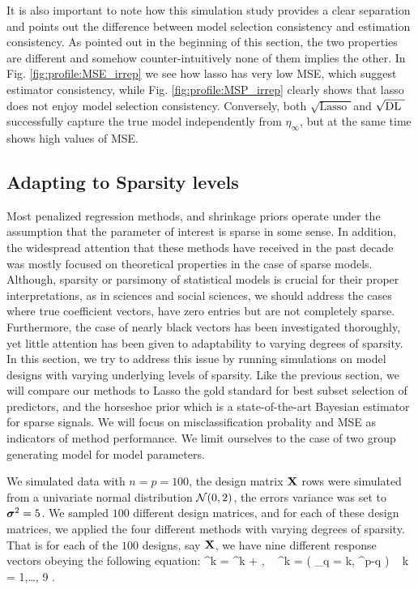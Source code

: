 \documentclass[chapters]{uamaththesis}
\def\sql{$\sqrt{\text{Lasso }}$}
\def\sqdl{$\sqrt{\text{\rm{DL} }}$}
\begin{document}
It is also important to note how this simulation study provides a clear separation and points out the difference between model selection consistency and estimation consistency. As pointed out in the beginning of this section, the two properties are different and somehow counter-intuitively none of them implies the other. In Fig. \ref{fig:profile:MSE_irrep} we see how lasso has very low MSE, which suggest estimator consistency, while Fig. \ref{fig:profile:MSP_irrep} clearly shows that lasso does not enjoy model selection consistency. Conversely, both \sql and \sqdl successfully capture the true model independently from $\eta_{\infty}$, but at the same time shows high values of MSE.



\subsection{Adapting to Sparsity levels}

Most penalized regression methods, and shrinkage priors operate under the assumption that the parameter of interest is sparse in some sense. In addition, the widespread attention that these methods have received in the past decade was mostly focused on theoretical properties in the case of sparse models. Although, sparsity or parsimony of statistical models is crucial for their proper interpretations, as in sciences
and social sciences, we should address the cases where true coefficient vectors, have zero entries but are not completely sparse. Furthermore, the case of nearly black vectors has been investigated thoroughly, yet little attention has been given to adaptability to varying degrees of sparsity. In this section, we try to address this issue by running simulations on model designs with varying underlying levels of sparsity. Like the previous section, we will compare our methods to Lasso the gold standard for best subset selection of predictors, and the horseshoe prior which is a state-of-the-art Bayesian estimator for sparse signals. We will focus on misclassification probality and MSE as indicators of method performance. We limit ourselves to the case of two group generating model for model parameters. 

We simulated data with $n = p = 100$, the design matrix ${\bf X}$ rows were simulated from a univariate normal distribution $\mathcal{N}(0 ,2)$, the errors variance was set to $\boldsymbol{\sigma}^2 = 5 $. We sampled $100$ different design matrices, and for each of these design matrices, we applied the four different methods with varying degrees of sparsity. That is for each of the $100$ designs, say ${\bf X}$, we have nine different response vectors obeying the following equation:
\beq\label{sparsity_mod}
\y^{k} = \X \bbeta^{k} + \bepsilon, \  \bbeta^{k} =  ( _{q = k}, ^{p-q} ) \  k = 1,\ldots, 9 .
\eeq
\end{document}
